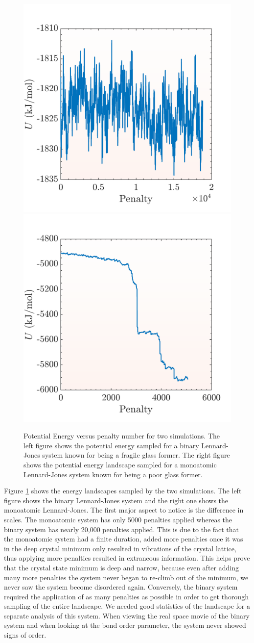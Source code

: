 \begin{figure}[h]
	\centering
	\includegraphics[width=.45\textwidth]{./Figures/Landscape/glassy_landscape.pdf}
	\hspace{.01\textwidth}
	\includegraphics[width=.45\textwidth]{./Figures/Landscape/crystal_landscape.pdf}
	\caption{Potential Energy versus penalty number for two simulations.  The left figure shows the potential energy sampled for a binary Lennard-Jones system known for being a fragile glass former.  The right figure shows the potential energy landscape sampled for a monoatomic Lennard-Jones system known for being a poor glass former.}
	\label{compare_landscape}
\end{figure}

Figure \ref{compare_landscape} shows the energy landscapes sampled by the two simulations.  The left figure shows the binary Lennard-Jones system and the right one shows the monoatomic Lennard-Jones.  The first major aspect to notice is the difference in scales.  The monoatomic system has only 5000 penalties applied whereas the binary system has nearly 20,000 penalties applied.  This is due to the fact that the monoatomic system had a finite duration, added more penalties once it was in the deep crystal minimum only resulted in vibrations of the crystal lattice, thus applying more penalties resulted in extraneous information.  This helps prove that the crystal state minimum is deep and narrow, because even after adding many more penalties the system never began to re-climb out of the minimum, we never saw the system become disordered again.  Conversely, the binary system required the application of as many penalties as possible in order to get thorough sampling of the entire landscape.  We needed good statistics of the landscape for a separate analysis of this system.  When viewing the real space movie of the binary system and when looking at the bond order parameter, the system never showed signs of order.  

